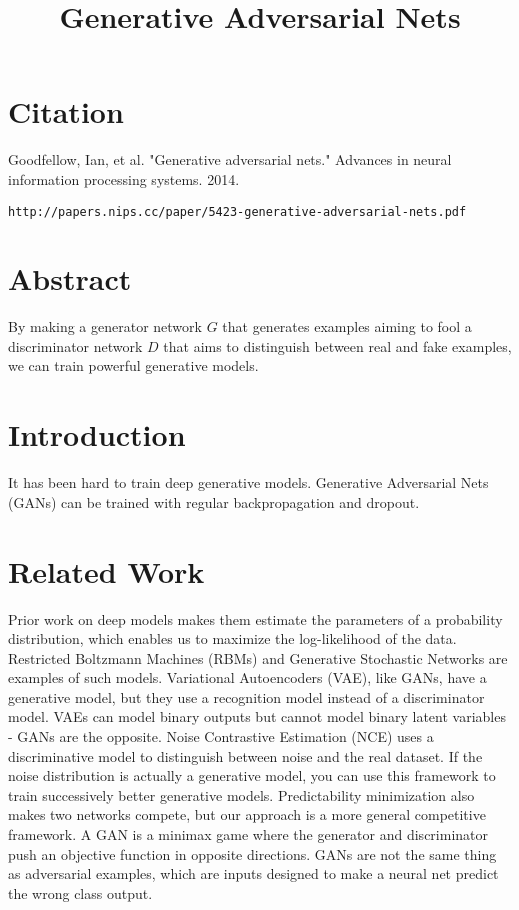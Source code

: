 \documentclass[a4paper]{article}
\title{Generative Adversarial Nets}
\date{}
\begin{document}
\maketitle

\section{Citation}
Goodfellow, Ian, et al. "Generative adversarial nets." Advances in neural information processing systems. 2014.

\begin{verbatim}
http://papers.nips.cc/paper/5423-generative-adversarial-nets.pdf
\end{verbatim}

\section{Abstract}
By making a generator network $G$ that generates examples aiming to fool
a discriminator network $D$ that aims to distinguish between real and fake
examples, we can train powerful generative models.

\section{Introduction}
It has been hard to train deep generative models. Generative Adversarial Nets
(GANs) can be trained with regular backpropagation and dropout.

\section{Related Work}
Prior work on deep models makes them estimate the parameters of a probability
distribution, which enables us to maximize the log-likelihood of the data.
Restricted Boltzmann Machines (RBMs) and Generative Stochastic Networks are
examples of such models. Variational Autoencoders (VAE), like GANs, have a
generative model, but they use a recognition model instead of a discriminator
model. VAEs can model binary outputs but cannot model binary latent variables
- GANs are the opposite. Noise Contrastive Estimation (NCE) uses a
discriminative model to distinguish between noise and the real dataset. If the
noise distribution is actually a generative model, you can use this framework
to train successively better generative models. Predictability minimization
also makes two networks compete, but our approach is a more general competitive
framework. A GAN is a minimax game where the generator and discriminator push
an objective function in opposite directions. GANs are not the same thing as
adversarial examples, which are inputs designed to make a neural net predict
the wrong class output.
\end{document}
